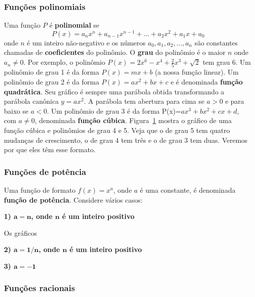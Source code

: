 \subsubsection{Funções polinomiais}
Uma função $P$ é \textbf{polinomial} se $$P(x)=a_nx^n+a_{n-1}x^{n-1}+\dots+a_2x^2+a_1x+a_0$$
onde $n$ é um inteiro não-negativo e os números $a_0,a_1,a_2,\dots,a_n$ são constantes chamadas de \textbf{coeficientes} do polinômio. O \textbf{grau} do polinômio é o maior $n$ onde $a_n\neq 0$. Por exemplo, o polinômio $P(x)=2x^6-x^4+\frac{2}{5}x^3+\sqrt{2}$ tem grau 6. Um polinômio de grau 1 é da forma $P(x)=mx+b$ (a nossa função linear). Um polinômio de grau 2 é da forma $P(x)=ax^2+bx+c$ e é denominada \textbf{função quadrática}. Seu gráfico é sempre uma parábola obtida transformando a parábola canônica $y=ax^2$. A parábola tem abertura para cima se $a>0$ e para baixo se $a<0$. Um polinômio de grau 3 é da forma P(x)=$ax^3+bx^2+cx+d$, com $a\neq 0$, denominada \textbf{função cúbica}. Figura~\ref{fig:polinomiais} mostra o gráfico de uma função cúbica e polinômios de grau 4 e 5. Veja que o de grau 5 tem quatro mudanças de crescimento, o de grau 4 tem três e o de grau 3 tem duas. Veremos por que eles têm esse formato.
\begin{figure}[!ht]
  \centering
  \caption{}\label{fig:polinomiais}
\end{figure}
\subsubsection{Funções de potência}
Uma função de formato $f(x)=x^a$, onde $a$ é uma constante, é denominada \textbf{função de potência}. Considere vários casos:

\noindent \textbf{1) $\boldsymbol{a=n}$, onde $\boldsymbol{n}$ é um inteiro positivo}

Os gráficos 

\noindent \textbf{2) $\boldsymbol{a=1/n}$, onde $\boldsymbol{n}$ é um inteiro positivo}


\noindent \textbf{3) $\boldsymbol{a=-1}$}


\subsubsection{Funções racionais}

